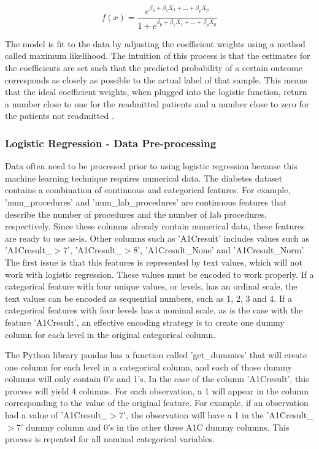 \documentclass[sigconf]{acmart}
\begin{document}
\[ f(x) =\frac{e^{\beta_0 + \beta_1X_1 + ... + \beta_pX_p}}{1 + e^{\beta_0 + \beta_1X_1 + ... + \beta_pX_p}}  \]

The model is fit to the data by adjusting the coefficient weights using a method called maximum likelihood. The intuition of this process is that the estimates for the coefficients are set such that the predicted probability of a certain outcome corresponds as closely as possible to the actual label of that sample. This means that the ideal coefficient weights, when plugged into the logistic function, return a number close to one for the readmitted patients and a number close to zero for the patients not readmitted \cite{cite08}.

\subsubsection{Logistic Regression - Data Pre-processing}

Data often need to be processed prior to using logistic regression because this machine learning technique requires numerical data. The diabetes dataset contains a combination of continuous and categorical features. For example, 'num\_procedures' and 'num\_lab\_procedures' are continuous features that describe the number of procedures and the number of lab procedures, respectively. Since these columns already contain numerical data, these features are ready to use as-is. Other columns such as 'A1Cresult' includes values such as 'A1Cresult\_$>$7', 'A1Cresult\_$>$8', 'A1Cresult\_None' and 'A1Cresult\_Norm'. The first issue is that this features is represented by text values, which will not work with logistic regression. These values must be encoded to work properly. If a categorical feature with four unique values, or levels, has an ordinal scale, the text values can be encoded as sequential numbers, such as 1, 2, 3 and 4. If a categorical features with four levels has a nominal scale, as is the case with the feature 'A1Cresult', an effective encoding strategy is to create one dummy column for each level in the original categorical column.

The Python library pandas has a function called 'get\_dummies' that will create one column for each level in a categorical column, and each of those dummy columns will only contain 0's and 1's. In the case of the column 'A1Cresult', this process will yield 4 columns. For each observation, a 1 will appear in the column corresponding to the value of the original feature. For example, if an observation had a value of 'A1Cresult\_$>$7', the observation will have a 1 in the 'A1Cresult\_$>$7' dummy column and 0's in the other three A1C dummy columns. This process is repeated for all nominal categorical variables.
\end{document}
